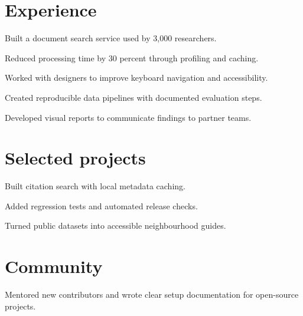 \documentclass[]{deedy-resume-openfont}
\begin{document}
\begin{minipage}[t]{0.65\textwidth}
\section{Experience}
\vspace{4pt}
\begin{tightemize}
\item Built a document search service used by 3,000 researchers.
\item Reduced processing time by 30 percent through profiling and caching.
\item Worked with designers to improve keyboard navigation and accessibility.
\end{tightemize}\sectionsep
{}
\begin{tightemize}
\item Created reproducible data pipelines with documented evaluation steps.
\item Developed visual reports to communicate findings to partner teams.
\end{tightemize}\sectionsep
\section{Selected projects}
\begin{tightemize}\item Built citation search with local metadata caching.\item Added regression tests and automated release checks.\end{tightemize}\sectionsep
{}
\begin{tightemize}\item Turned public datasets into accessible neighbourhood guides.\end{tightemize}\sectionsep
\section{Community}Mentored new contributors and wrote clear setup documentation for open-source projects.
\end{minipage}
\end{document}
